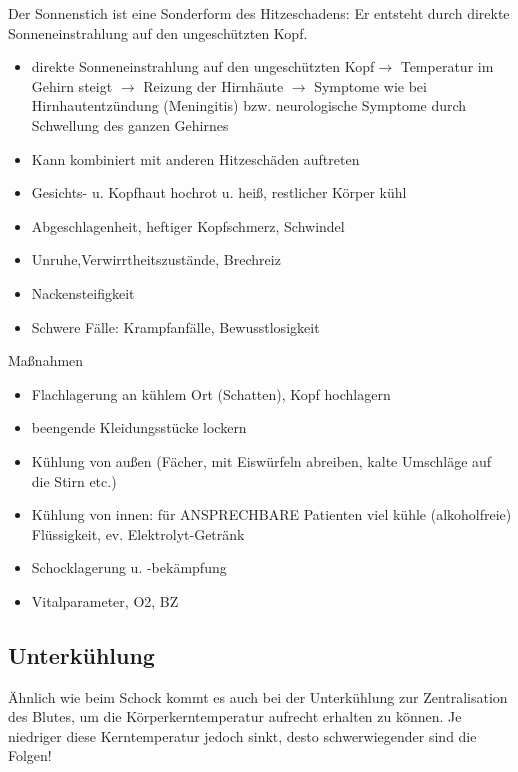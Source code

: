 \documentclass{article}
\begin{document}
Der Sonnenstich ist eine Sonderform des  Hitzeschadens: Er entsteht
durch direkte  Sonneneinstrahlung auf den ungesch\"utzten  Kopf. 

\begin{itemize}
\item direkte  Sonneneinstrahlung auf den ungesch\"utzten 
Kopf${\rightarrow}$ Temperatur  im Gehirn  steigt  ${\rightarrow}$
Reizung der Hirnh\"aute  ${\rightarrow}$ Symptome wie bei 
Hirnhautentz\"undung (Meningitis) bzw.  neurologische Symptome durch 
Schwellung des ganzen Gehirnes

\item Kann kombiniert mit anderen Hitzesch\"aden auftreten

\item Gesichts- u. Kopfhaut hochrot u. hei{\ss}, restlicher K\"orper
k\"uhl

\item Abgeschlagenheit, heftiger Kopfschmerz, Schwindel

\item Unruhe,Verwirrtheitszust\"ande, Brechreiz

\item Nackensteifigkeit

\item Schwere F\"alle: Krampfanf\"alle, Bewusstlosigkeit

\end{itemize}
Ma{\ss}nahmen

\begin{itemize}
\item Flachlagerung an k\"uhlem Ort (Schatten), Kopf hochlagern

\item beengende Kleidungsst\"ucke lockern

\item K\"uhlung von au{\ss}en (F\"acher, mit Eisw\"urfeln abreiben,
kalte Umschl\"age auf die Stirn etc.)

\item K\"uhlung von innen: f\"ur ANSPRECHBARE Patienten viel k\"uhle
(alkoholfreie) Fl\"ussigkeit, ev. Elektrolyt-Getr\"ank

\item Schocklagerung u. -bek\"ampfung

\item Vitalparameter, O2, BZ

\end{itemize}
\subsection{Unterk\"uhlung}
\"Ahnlich wie beim Schock kommt es auch  bei der Unterk\"uhlung zur
Zentralisation  des Blutes, um die  K\"orperkerntemperatur aufrecht
erhalten  zu k\"onnen. Je niedriger diese  Kerntemperatur jedoch sinkt,
desto  schwerwiegender sind die Folgen!
\end{document}
